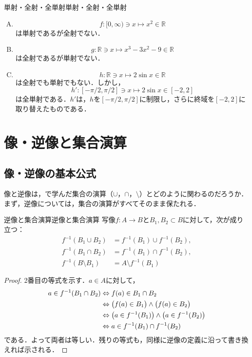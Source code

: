 \begin{example}{単射・全射・全単射}{単射・全射・全単射}
  \begin{enumerate}[(A)]
    \item
          \[
            f \colon [0,\infty) \ni x \mapsto x^2  \in \mathbb{R}
          \]
          は単射であるが全射でない．
    \item
          \[
            g \colon \mathbb{R} \ni x \mapsto x^3 -3x^2 -9 \in \mathbb{R}
          \]
          は全射であるが単射でない．
    \item
          \[
            h  \colon \mathbb{R} \ni x \mapsto  2 \sin x \in  \mathbb{R}
          \]
          は全射でも単射でもない．しかし，
          \[
            h'  \colon [-\pi/2 , \pi/2 ]  \ni x \mapsto  2 \sin  x  \in [-2,2]
          \]
          は全単射である．$h'$は，$h$を$[-\pi/2, \pi/2]$に制限し，さらに終域を$[-2, 2]$に取り替えたものである．
  \end{enumerate}
\end{example}

\section{像・逆像と集合演算}

\subsection{像・逆像の基本公式}

像と逆像は，で学んだ集合の演算（$\cup$，$\cap$，$\setminus$）とどのように関わるのだろうか．まず，逆像については，集合の演算がすべてそのまま保たれる．

\begin{prop}{逆像と集合演算}{逆像と集合演算}
  写像$f \colon A \to B$と$B_1, B_2 \subset B$に対して，次が成り立つ：
  \begin{align*}
    f^{-1}(B_1 \cup B_2) & = f^{-1}(B_1) \cup f^{-1}(B_2), \\
    f^{-1}(B_1 \cap B_2) & = f^{-1}(B_1) \cap f^{-1}(B_2), \\
    f^{-1}(B \setminus B_1) & = A \setminus f^{-1}(B_1)
  \end{align*}
\end{prop}

\begin{tleftbar}
  \begin{proof}
    2番目の等式を示す．$a \in A$に対して，
    \begin{align*}
      a \in f^{-1}(B_1 \cap B_2)
      & \mathrel{\Leftrightarrow} f(a) \in B_1 \cap B_2 \\
      & \mathrel{\Leftrightarrow} \bigl( f(a) \in B_1 \bigr) \land \bigl( f(a) \in B_2 \bigr) \\
      & \mathrel{\Leftrightarrow} \bigl( a \in f^{-1}(B_1) \bigr) \land \bigl( a \in f^{-1}(B_2) \bigr) \\
      & \mathrel{\Leftrightarrow} a \in f^{-1}(B_1) \cap f^{-1}(B_2)
    \end{align*}
    である．よって両者は等しい．残りの等式も，同様に逆像の定義に沿って書き換えれば示される．
  \end{proof}
\end{tleftbar}

